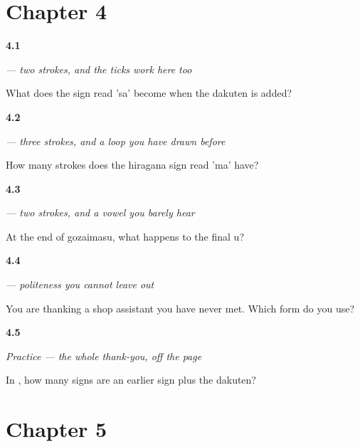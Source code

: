 \section*{Chapter 4}

\noindent\begin{minipage}[t]{\linewidth}
\raggedright
\hypertarget{review-JA-W03-sa-za}{\textbf{4.1}} \emph{ — two strokes, and the ticks work here too}\par
\small What does the sign read 'sa' become when the dakuten is added?
\end{minipage}\par\medskip

\noindent\begin{minipage}[t]{\linewidth}
\raggedright
\hypertarget{review-JA-W03-ma-strokes}{\textbf{4.2}} \emph{ — three strokes, and a loop you have drawn before}\par
\small How many strokes does the hiragana sign read 'ma' have?
\end{minipage}\par\medskip

\noindent\begin{minipage}[t]{\linewidth}
\raggedright
\hypertarget{review-JA-W03-su-devoice}{\textbf{4.3}} \emph{ — two strokes, and a vowel you barely hear}\par
\small At the end of gozaimasu, what happens to the final u?
\end{minipage}\par\medskip

\noindent\begin{minipage}[t]{\linewidth}
\raggedright
\hypertarget{review-JA-C01-gozaimasu-level}{\textbf{4.4}} \emph{ — politeness you cannot leave out}\par
\small You are thanking a shop assistant you have never met. Which form do you use?
\end{minipage}\par\medskip

\noindent\begin{minipage}[t]{\linewidth}
\raggedright
\hypertarget{review-JA-C03-practice-ticks}{\textbf{4.5}} \emph{Practice — the whole thank-you, off the page}\par
\small In , how many signs are an earlier sign plus the dakuten?
\end{minipage}\par\medskip

\section*{Chapter 5}

